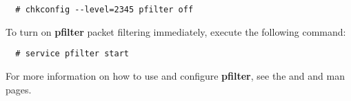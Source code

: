 \begin{verbatim}
  # chkconfig --level=2345 pfilter off
\end{verbatim}

To turn on {\bf pfilter} packet filtering immediately, execute the
following command:

\begin{verbatim}
  # service pfilter start
\end{verbatim}

For more information on how to use and configure {\bf pfilter}, see
the  and  and
 man pages. 
